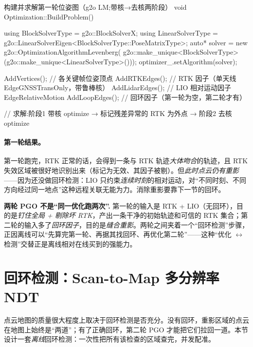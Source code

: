 \begin{codebox}[C++]{构建并求解第一轮位姿图（g2o LM;带核→去核两阶段）}
void Optimization::BuildProblem() {
  using BlockSolverType  = g2o::BlockSolverX;
  using LinearSolverType = g2o::LinearSolverEigen<BlockSolverType::PoseMatrixType>;
  auto* solver = new g2o::OptimizationAlgorithmLevenberg(
      g2o::make_unique<BlockSolverType>(g2o::make_unique<LinearSolverType>()));
  optimizer_.setAlgorithm(solver);

  AddVertices();     // 各关键帧位姿顶点
  AddRTKEdges();     // RTK 因子（单天线 EdgeGNSSTransOnly，带鲁棒核）
  AddLidarEdges();   // LIO 相对运动因子 EdgeRelativeMotion
  AddLoopEdges();    // 回环因子（第一轮为空，第二轮才有）
}
// 求解:阶段1 带核 optimize → 标记残差异常的 RTK 为外点 → 阶段2 去核 optimize
\end{codebox}

\paragraph{第一轮结果。}
第一轮跑完，RTK 正常的话，会得到一条与 RTK 轨迹\emph{大体吻合}的轨迹，且 RTK 失效区域被很好地识别出来（标记为无效、其因子被剔）。但\emph{此时点云仍有重影}——因为还没做回环检测：LIO 只约束\emph{连续时刻}的相对运动，对“不同时刻、不同方向经过同一地点”这种远程关联无能为力。消除重影要靠下一节的回环。

\begin{note}
\textbf{两轮 PGO 不是“同一优化跑两次”.}\;
第一轮的输入是 RTK + LIO（无回环），目的是\emph{钉住全局 + 剔除坏 RTK}，产出一条干净的初始轨迹和可信的 RTK 集合；第二轮的输入多了\emph{回环因子}，目的是\emph{缝合重影}。两轮之间夹着一个“回环检测”步骤，正因离线可以“先算完第一轮、再据其找回环、再优化第二轮”——这种“优化 $\leftrightarrow$ 检测”交替正是离线相对在线买到的强能力。
\end{note}

\section{回环检测：Scan-to-Map 多分辨率 NDT}
\label{sec:lidar-map-loop}

点云地图的质量很大程度上取决于回环检测是否充分\cite{gao2023slamad}。没有回环，重影区域的点云在地图上始终是“两道”；有了正确回环，第二轮 PGO 才能把它们拉回一道。本节设计一套\emph{离线}回环检测：一次性把所有该检查的区域查完，并发配准。

